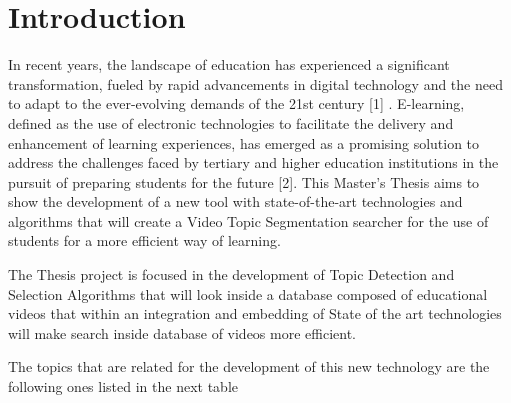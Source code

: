 \chapter{Introduction}

In recent years, the landscape of education has experienced a significant transformation, fueled by rapid advancements in digital technology and the need to adapt to the ever-evolving demands of the 21st century   [1]    . E-learning, defined as the use of electronic technologies to facilitate the delivery and enhancement of learning experiences, has emerged as a promising solution to address the challenges faced by tertiary and higher education institutions in the pursuit of preparing students for the future [2]. This Master's Thesis aims to show the development of a new tool with state-of-the-art technologies and algorithms that will create a Video Topic Segmentation searcher for the use of students for a more efficient way of learning. 

The Thesis project is focused in the development of Topic Detection and Selection Algorithms that will look inside a database composed of educational videos that within an integration and embedding of State of the art technologies will make search inside database of videos more efficient.

The topics that are related for the development of this new technology are the following ones listed in the next table


